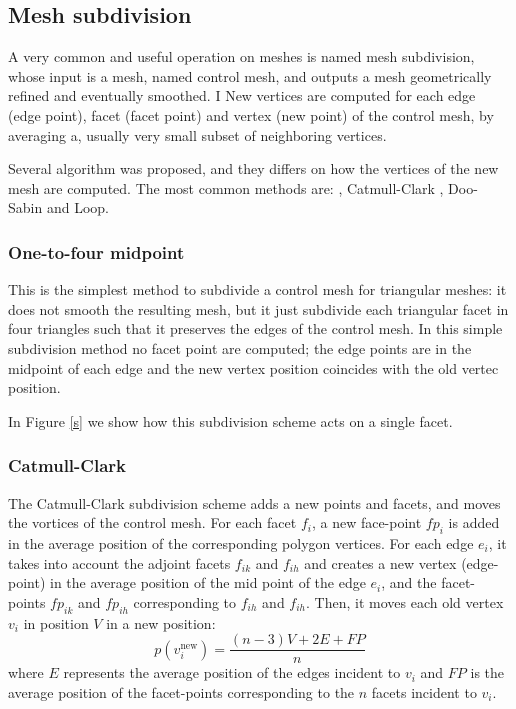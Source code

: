 \subsection{Mesh subdivision}
A very common and useful operation on meshes is named mesh subdivision, whose input is a mesh, named control mesh, and outputs a mesh geometrically refined and eventually smoothed. I
New vertices are computed for each edge (edge point), facet (facet point) and vertex (new point) of the control mesh, by averaging a, usually very small subset of neighboring vertices.


Several algorithm was proposed, and they differs on how the vertices of the new mesh are computed. 
The most common methods are: , Catmull-Clark \cite{catmull1978recursively}, Doo-Sabin \cite{doo1978subdivision} and Loop.

\subsubsection{One-to-four midpoint}

This is the simplest method to subdivide a control mesh for triangular meshes: it does not smooth the resulting mesh, but it just subdivide each triangular facet in four triangles such that it preserves the edges of the control mesh.
In this simple subdivision method no facet point are computed; the edge points are in the midpoint of each edge and the new vertex position coincides with the old vertec position.


In Figure \ref{s} we show how this subdivision scheme acts on a single facet.


\subsubsection{Catmull-Clark}
The Catmull-Clark subdivision scheme adds a new points and facets, and moves the vortices of the control mesh. 
For each facet $f_i$, a new face-point $fp_i$ is added in the average position of the corresponding polygon vertices. 
For each edge $e_i$, it takes into account the adjoint facets $f_{ik}$ and $f_{ih}$ and creates a new vertex (edge-point) in the average position of the mid point of the edge $e_i$, and the facet-points $fp_{ik}$ and $fp_{ih}$ corresponding to $f_{ih}$ and $f_{ih}$.
Then, it moves each old vertex $v_i$ in position $V$ in a new position:
\[
p(v_i^{\text{new}}) = \frac{(n-3)V + 2E + FP}{n}
\]
where $E$ represents the average position of the edges incident to $v_i$ and  $FP$ is the average position of the facet-points corresponding to the $n$ facets incident to $v_i$.

